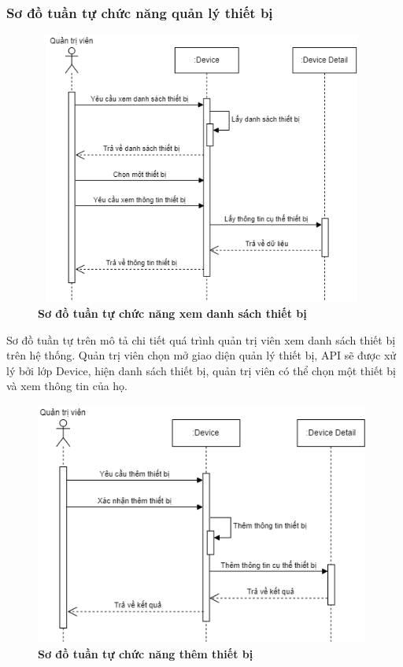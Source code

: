 \subsubsection{Sơ đồ tuần tự chức năng quản lý thiết bị}
\begin{figure}[H]
  \centering
  \includegraphics[width=11cm,height=9cm]{Images/sequence/sequence_manage_device.png}
  \caption[Sơ đồ tuần tự chức năng xem danh sách thiết bị]{\bfseries \fontsize{12pt}{0pt}
  \selectfont Sơ đồ tuần tự chức năng xem danh sách thiết bị}
  \label{sequence_manage_device} %
\end{figure}
Sơ đồ tuần tự trên mô tả chi tiết quá trình quản trị viên xem danh sách thiết bị trên hệ thống. Quản trị viên chọn mở giao diện quản lý thiết bị, 
API sẽ được xử lý bởi lớp Device, hiện danh sách thiết bị, quản trị viên có thể chọn một thiết bị và xem thông tin của họ. 
\begin{figure}[H]
  \centering
  \includegraphics[width=11cm,height=8cm]{Images/sequence/sequence_manage_add_device.png}
  \caption[Sơ đồ tuần tự chức năng thêm thiết bị]{\bfseries \fontsize{12pt}{0pt}
  \selectfont Sơ đồ tuần tự chức năng thêm thiết bị}
  \label{sequence_manage_add_device} %
\end{figure}
